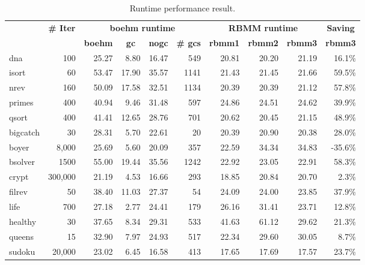 \documentclass{tlp}
\begin{document}
\begin{table}[tb]
  \centering
  \small
  \caption{Runtime performance result.}
  \scriptsize
  \begin{tabular}{l|*{9}{r|}}
    \hline
    \hline
    \multirow{2}{*}{}
    & \multicolumn{1}{c|}{\multirow{2}{*}{\textbf{\# Iter}}}
    & \multicolumn{4}{c|}{\textbf{boehm runtime}}
    & \multicolumn{3}{c|}{\textbf{RBMM runtime}}
    & \multicolumn{1}{c|}{\textbf{Saving}}\\
    &
    & \multicolumn{1}{c}{\textbf{boehm}}
    & \multicolumn{1}{c}{\textbf{gc}}
    & \multicolumn{1}{c}{\textbf{nogc}}
    & \multicolumn{1}{c|}{\textbf{\# gcs}}
    & \multicolumn{1}{c}{\textbf{rbmm1}}
    & \multicolumn{1}{c}{\textbf{rbmm2}}
    & \multicolumn{1}{c|}{\textbf{rbmm3}}
    & \multicolumn{1}{c|}{\textbf{rbmm3}}\\
    \hline
    dna      &     100 & 25.27 &  8.80 & 16.47 &  549 & 20.81 & 20.20 & 21.19 & 16.1\% \\
    isort    &      60 & 53.47 & 17.90 & 35.57 & 1141 & 21.43 & 21.45 & 21.66 & 59.5\% \\
    nrev     &     160 & 50.09 & 17.58 & 32.51 & 1134 & 20.39 & 20.39 & 21.12 & 57.8\% \\
    primes   &     400 & 40.94 &  9.46 & 31.48 &  597 & 24.86 & 24.51 & 24.62 & 39.9\% \\
    qsort    &     400 & 41.41 & 12.65 & 28.76 &  701 & 20.62 & 20.45 & 21.15 & 48.9\% \\
    \hline
    bigcatch &      30 & 28.31 &  5.70 & 22.61 &   20 & 20.39 & 20.90 & 20.38 & 28.0\% \\
    boyer    &   8,000 & 25.69 &  5.60 & 20.09 &  357 & 22.59 & 34.34 & 34.83 &-35.6\% \\
    bsolver  &    1500 & 55.00 & 19.44 & 35.56 & 1242 & 22.92 & 23.05 & 22.91 & 58.3\% \\
    crypt    & 300,000 & 21.19 &  4.53 & 16.66 &  293 & 18.85 & 20.84 & 20.70 &  2.3\% \\
    filrev   &      50 & 38.40 & 11.03 & 27.37 &   54 & 24.09 & 24.00 & 23.85 & 37.9\% \\
    life     &     700 & 27.18 &  2.77 & 24.41 &  179 & 26.16 & 31.41 & 23.71 & 12.8\% \\
    healthy  &      30 & 37.65 &  8.34 & 29.31 &  533 & 41.63 & 61.12 & 29.62 & 21.3\% \\
    queens   &      15 & 32.90 &  7.97 & 24.93 &  517 & 22.34 & 29.60 & 30.05 &  8.7\% \\
    sudoku   &  20,000 & 23.02 &  6.45 & 16.58 &  413 & 17.65 & 17.69 & 17.57 & 23.7\% \\

\end{tabular}
\end{table}
\end{document}
